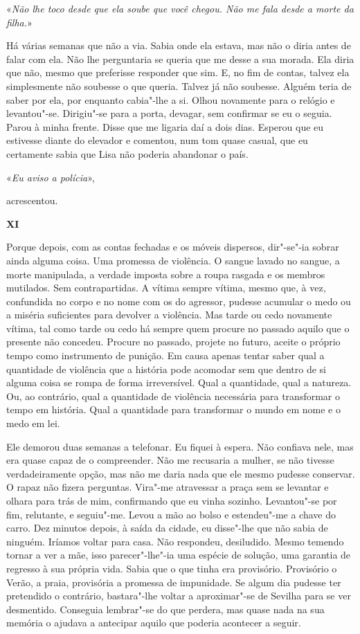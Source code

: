 «\emph{Não lhe toco desde que ela soube que você chegou. Não me fala
desde a morte da filha.}»

Há várias semanas que não a via. Sabia onde ela estava, mas não o diria
antes de falar com ela. Não lhe perguntaria se queria que me desse a sua
morada. Ela diria que não, mesmo que preferisse responder que sim. E, no
fim de contas, talvez ela simplesmente não soubesse o que queria. Talvez
já não soubesse. Alguém teria de saber por ela, por enquanto cabia"-lhe
a si. Olhou novamente para o relógio e levantou"-se. Dirigiu"-se para a
porta, devagar, sem confirmar se eu o seguia. Parou à minha frente.
Disse que me ligaria daí a dois dias. Esperou que eu estivesse diante do
elevador e comentou, num tom quase casual, que eu certamente sabia que
Lisa não poderia abandonar o país.

«\emph{Eu aviso a polícia}»,

acrescentou.

\vspace*{1.8cm}
\noindent{}\textbf{XI}

\bigskip

Porque depois, com as contas fechadas e os móveis dispersos, dir"-se"-ia
sobrar ainda alguma coisa. Uma promessa de violência. O sangue lavado no
sangue, a morte manipulada, a verdade imposta sobre a roupa rasgada e os
membros mutilados. Sem contrapartidas. A vítima sempre vítima, mesmo
que, à vez, confundida no corpo e no nome com os do agressor, pudesse
acumular o medo ou a miséria suficientes para devolver a violência. Mas
tarde ou cedo novamente vítima, tal como tarde ou cedo há sempre quem
procure no passado aquilo que o presente não concedeu. Procure no
passado, projete no futuro, aceite o próprio tempo como instrumento de
punição. Em causa apenas tentar saber qual a quantidade de violência que
a história pode acomodar sem que dentro de si alguma coisa se rompa de
forma irreversível. Qual a quantidade, qual a natureza. Ou, ao
contrário, qual a quantidade de violência necessária para transformar o
tempo em história. Qual a quantidade para transformar o mundo em nome e
o medo em lei.

Ele demorou duas semanas a telefonar. Eu fiquei à espera. Não confiava
nele, mas era quase capaz de o compreender. Não me recusaria a mulher,
se não tivesse verdadeiramente opção, mas não me daria nada que ele
mesmo pudesse conservar. O rapaz não fizera perguntas. Vira"-me
atravessar a praça sem se levantar e olhara para trás de mim,
confirmando que eu vinha sozinho. Levantou"-se por fim, relutante, e
seguiu"-me. Levou a mão ao bolso e estendeu"-me a chave do carro. Dez
minutos depois, à saída da cidade, eu disse"-lhe que não sabia de
ninguém. Iríamos voltar para casa. Não respondeu, desiludido. Mesmo
temendo tornar a ver a mãe, isso parecer"-lhe"-ia uma espécie de
solução, uma garantia de regresso à sua própria vida. Sabia que o que
tinha era provisório. Provisório o Verão, a praia, provisória a promessa
de impunidade. Se algum dia pudesse ter pretendido o contrário,
bastara"-lhe voltar a aproximar"-se de Sevilha para se ver desmentido.
Conseguia lembrar"-se do que perdera, mas quase nada na sua memória o
ajudava a antecipar aquilo que poderia acontecer a seguir.

